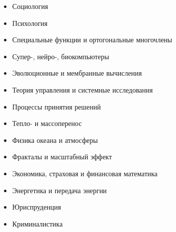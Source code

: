 \documentclass[10pt]{book}
\begin{document}
{\begin{multicols}{2}
\begin{itemize}
  Системы поддержки принятия решений для регионального управления\item 
  Социология\item 
  Психология\item 
  Специальные функции и ортогональные многочлены\item 
  Супер-, нейро-, биокомпьютеры\item
  Эволюционные и мембранные вычисления\item
  Теория управления и системные исследования\item
Процессы принятия решений\item 
Тепло- и массоперенос\item 
Физика океана и атмосферы\item 
Фракталы и масштабный эффект\item 
Экономика, страховая и финансовая матема\-тика\item 
Энергетика и передача энергии\item
Юриспруденция\item 
Криминалистика
\end{itemize}
\end{multicols}
}

\smallskip
\end{document}
